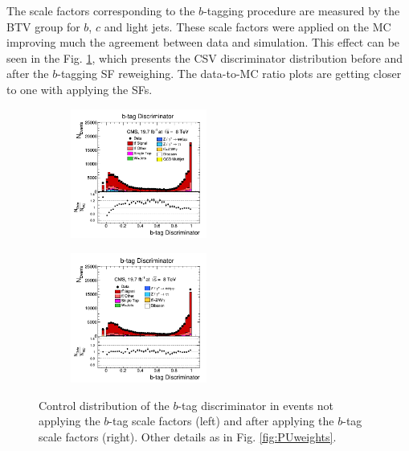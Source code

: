\begin{itemize}
 The scale factors corresponding to the $b$-tagging procedure are measured by the BTV group \cite{CMS-PAS-BTV-13-001} for $b$, $c$ and light jets. These scale factors were applied on the MC 
 improving much the agreement between data and simulation. This effect can be seen in the 
 Fig. \ref{fig:bTagDiscr}, which presents the CSV discriminator distribution before and after the $b$-tagging SF reweighing. The data-to-MC ratio plots are getting closer to one with
 applying the SFs.
 
 \begin{figure}[h]
 \centering
 \begin{subfigure}
   \centering
   \includegraphics[width=0.49\textwidth]{04_event_reconstruction/plots/bTagDiscr_step6.png}
 \end{subfigure}
 \begin{subfigure}
   \centering
   \includegraphics[width=0.49\textwidth]{04_event_reconstruction/plots/bTagDiscr_step7.png}
 \end{subfigure}
 \caption{Control distribution of the $b$-tag discriminator in events not applying the $b$-tag scale factors (left)
 and after applying the $b$-tag scale factors (right). Other details as in Fig. \ref{fig:PUweights}.}
 \label{fig:bTagDiscr}
 \end{figure}
 \end{itemize}

